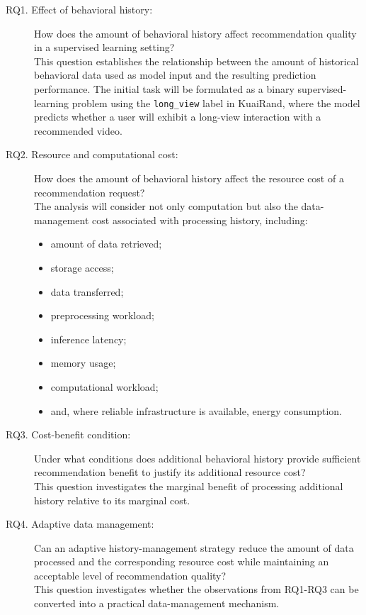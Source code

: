 \documentclass[12pt,a4paper]{article}
\begin{document}
\begin{description}
    \item[RQ1. Effect of behavioral history:] How does the amount of behavioral history affect recommendation quality in a supervised learning setting?\\
    This question establishes the relationship between the amount of historical behavioral data used as model input and the resulting prediction performance. The initial task will be formulated as a binary supervised-learning problem using the \texttt{long\_view} label in KuaiRand, where the model predicts whether a user will exhibit a long-view interaction with a recommended video.

    \item[RQ2. Resource and computational cost:] How does the amount of behavioral history affect the resource cost of a recommendation request?\\
    The analysis will consider not only computation but also the data-management cost associated with processing history, including:
    \begin{itemize}
        \item amount of data retrieved;
        \item storage access;
        \item data transferred;
        \item preprocessing workload;
        \item inference latency;
        \item memory usage;
        \item computational workload;
        \item and, where reliable infrastructure is available, energy consumption.
    \end{itemize}

    \item[RQ3. Cost-benefit condition:] Under what conditions does additional behavioral history provide sufficient recommendation benefit to justify its additional resource cost?\\
    This question investigates the marginal benefit of processing additional history relative to its marginal cost.

    \item[RQ4. Adaptive data management:] Can an adaptive history-management strategy reduce the amount of data processed and the corresponding resource cost while maintaining an acceptable level of recommendation quality?\\
    This question investigates whether the observations from RQ1-RQ3 can be converted into a practical data-management mechanism.
\end{description}
\end{document}
